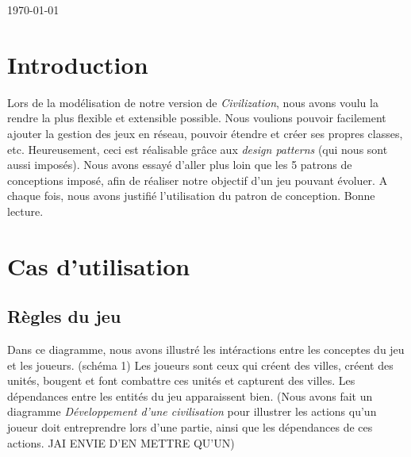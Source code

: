 \begin{titlepage}

{\large \today}\\[3cm] %


 

\vfill %

\end{titlepage}

\tableofcontent

\section{Introduction}

	Lors de la modélisation de notre version de \textit{Civilization}, nous avons voulu la rendre la plus flexible et extensible possible.
Nous voulions pouvoir facilement ajouter la gestion des jeux en réseau, pouvoir étendre et créer ses propres classes, etc.
Heureusement, ceci est réalisable grâce aux \textit{design patterns} (qui nous sont aussi imposés).
Nous avons essayé d'aller plus loin que les 5 patrons de conceptions imposé, afin de réaliser notre objectif d'un jeu pouvant évoluer.
A chaque fois, nous avons justifié l'utilisation du patron de conception.
	Bonne lecture.

\section{Cas d'utilisation}
	\subsection{Règles du jeu}
		Dans ce diagramme, nous avons illustré les intéractions entre les conceptes du jeu et les joueurs. (schéma 1)
	Les joueurs sont ceux qui créent des villes, créent des unités, bougent et font combattre ces unités et capturent des villes.
	Les dépendances entre les entités du jeu apparaissent bien.
	(Nous avons fait un diagramme \textit{Développement d'une civilisation} pour illustrer les actions qu'un joueur doit entreprendre lors d'une partie,
	ainsi que les dépendances de ces actions. JAI ENVIE D'EN METTRE QU'UN)
	
